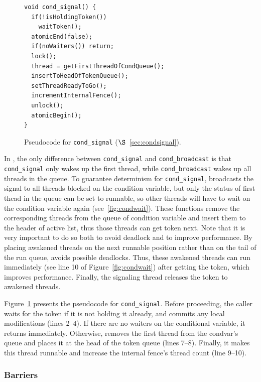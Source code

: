 \label{sec:condsignal}

\begin{figure}
\begin{lstlisting}
void cond_signal() {
  if(!isHoldingToken())
    waitToken();
  atomicEnd(false);
  if(noWaiters()) return;
  lock();
  thread = getFirstThreadOfCondQueue();
  insertToHeadOfTokenQueue();
  setThreadReadyToGo();
  incrementInternalFence();
  unlock();
  atomicBegin();
}
\end{lstlisting}
\caption{Pseudocode for \texttt{cond\_signal} ($\S$~\ref{sec:condsignal}). 
\label{fig:condsignal}}
\end{figure}

In \pthreads{}, the only difference between \texttt{cond\_signal}
and \texttt{cond\_broadcast} is that \texttt{cond\_signal} only wakes up the
first thread, while \texttt{cond\_broadcast} wakes up all threads in the
queue. To guarantee determinism for \texttt{cond\_signal}, \dthreads{}
broadcasts the signal to all threads blocked on the condition
variable, but only the status of first thead in the queue can be set
to runnable, so other threads will have to wait on the condition
variable again (see~\ref{fig:condwait}).
These functions remove the corresponding threads from the queue
of condition variable and insert them to the header of active list,
thus those threads can get token next.  Note that it is very important
to do so both to avoid deadlock and to improve performance. By placing
awakened threads on the next runnable position rather than on the tail
of the run queue, \dthreads{} avoids possible deadlocks. 
Thus, these awakened threads can run immediately (see line 10 of Figure~\ref{fig:condwait}) 
after getting the token, which improves performance. Finally, the
signaling thread releases the token to awakened threads.

Figure~\ref{fig:condsignal} presents the pseudocode
for \texttt{cond\_signal}. Before proceeding, the caller waits for
the token if it is not holding it already, and commits any local
modifications (lines 2--4).  If there are no waiters on the
conditional variable, it returns immediately. Otherwise, \dthreads{}
removes the first thread from the condvar's queue and places it at the
head of the token queue (lines 7--8). Finally, it makes this thread
runnable and increase the internal fence's thread count (line 9--10).

\subsubsection{Barriers}

